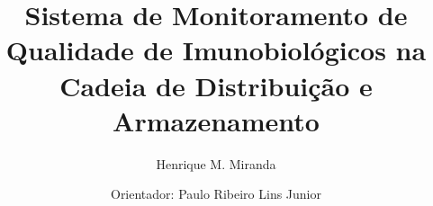 \documentclass[t]{beamer}
\title{Sistema de Monitoramento de Qualidade de Imunobiológicos na Cadeia de Distribuição e Armazenamento}
\subtitle{Henrique M. Miranda}
\author{Orientador: Paulo Ribeiro Lins Junior}
\begin{document}
\frame[c]{\maketitle}

\begin{darkframes}
  
  
  
  
  
\end{darkframes}
\end{document}
